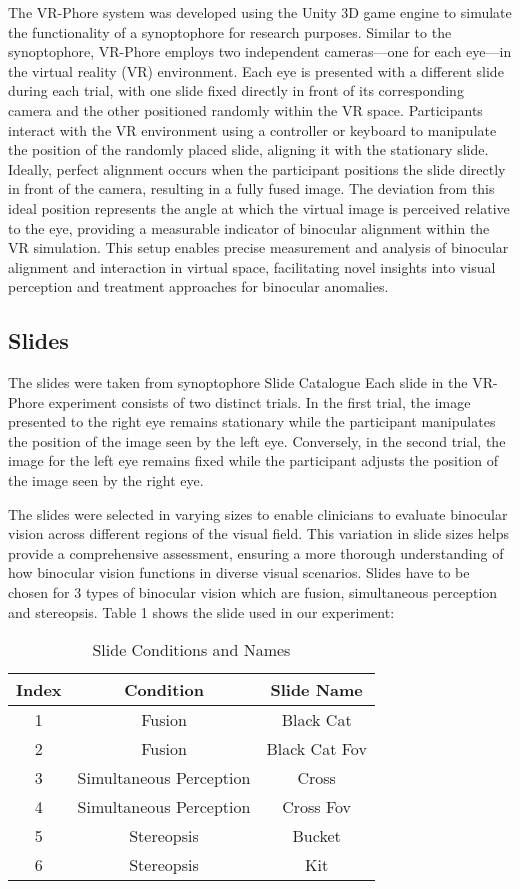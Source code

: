 \documentclass{article}
\begin{document}
The VR-Phore system was developed using the Unity 3D game engine to simulate the functionality of a synoptophore for research purposes. Similar to the synoptophore, VR-Phore employs two independent cameras—one for each eye—in the virtual reality (VR) environment. Each eye is presented with a different slide during each trial, with one slide fixed directly in front of its corresponding camera and the other positioned randomly within the VR space. Participants interact with the VR environment using a controller or keyboard to manipulate the position of the randomly placed slide, aligning it with the stationary slide. Ideally, perfect alignment occurs when the participant positions the slide directly in front of the camera, resulting in a fully fused image. The deviation from this ideal position represents the angle at which the virtual image is perceived relative to the eye, providing a measurable indicator of binocular alignment within the VR simulation. This setup enables precise measurement and analysis of binocular alignment and interaction in virtual space, facilitating novel insights into visual perception and treatment approaches for binocular anomalies.


\subsection{Slides}

The slides were taken from synoptophore Slide Catalogue \cite{synslide}
Each slide in the VR-Phore experiment consists of two distinct trials. In the first trial, the image presented to the right eye remains stationary while the participant manipulates the position of the image seen by the left eye. Conversely, in the second trial, the image for the left eye remains fixed while the participant adjusts the position of the image seen by the right eye. 

The slides were selected in varying sizes to enable clinicians to evaluate binocular vision across different regions of the visual field. This variation in slide sizes helps provide a comprehensive assessment, ensuring a more thorough understanding of how binocular vision functions in diverse visual scenarios. Slides have to be chosen for 3 types of binocular vision which are fusion, simultaneous perception and stereopsis. Table 1 shows the slide used in our experiment:

\begin{table}[h!]
\centering
\begin{tabular}{|c|c|c|}
\hline
\textbf{Index} & \textbf{Condition} & \textbf{Slide Name} \\ \hline
1 & Fusion & Black Cat \\ \hline
2 & Fusion & Black Cat Fov \\ \hline
3 & Simultaneous Perception & Cross \\ \hline
4 & Simultaneous Perception & Cross Fov \\ \hline
5 & Stereopsis & Bucket \\ \hline
6 & Stereopsis & Kit \\ \hline
\end{tabular}
\caption{Slide Conditions and Names}
\label{table:conditions}
\end{table}
\end{document}
